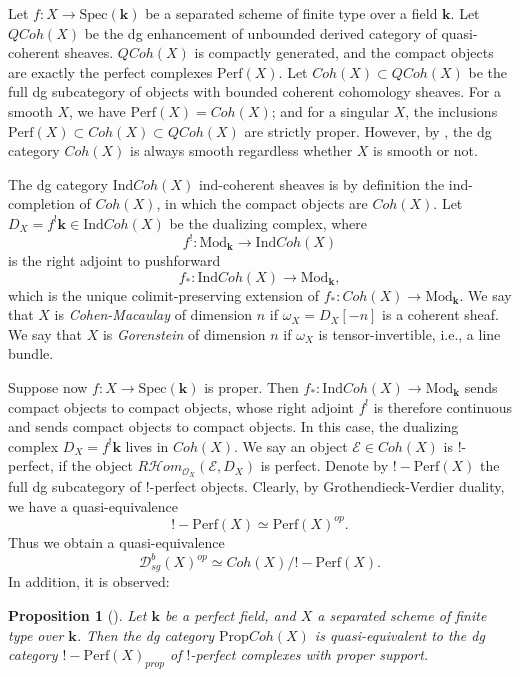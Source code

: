 \documentclass[11pt]{amsproc}
\def\K{{\mathbf{k}}}
\def\o{\mathcal{O}}
\def\dd{\mathcal{D}}
\def\ee{\mathcal{E}}
\def\r#1{\mathrm{#1}}
\def\perf{\mathrm{Perf}}
\newtheorem{prop}[lem]{Proposition}
\theoremstyle{remark}
\numberwithin{equation}{section}
\begin{document}
Let $f: X \to \r{Spec}(\K)$ be a separated scheme of finite type over a field $\K$.
Let $QCoh(X)$ be the dg enhancement of unbounded derived category of quasi-coherent sheaves.
$QCoh(X)$ is compactly generated, 
and the compact objects are exactly the perfect complexes $\perf(X)$.
Let $Coh(X) \subset QCoh(X)$ be the full dg subcategory of objects with bounded coherent cohomology sheaves.
For a smooth $X$, we have $\perf(X) = Coh(X)$;
and for a singular $X$, the inclusions $\perf(X) \subset Coh(X) \subset QCoh(X)$ are strictly proper.
However, by \cite[Theorem 6.3]{lunts}, the dg category $Coh(X)$ is always smooth regardless whether $X$ is smooth or not.

The dg category $\r{Ind}Coh(X)$ ind-coherent sheaves is by definition the ind-completion of $Coh(X)$,
in which the compact objects are $Coh(X)$.
Let $D_{X} = f^{!}\K \in \r{Ind} Coh(X)$ be the dualizing complex,
where 
\[
f^{!}: \r{Mod}_{\K} \to \r{Ind} Coh(X)
\]
is the right adjoint to pushforward 
\[
f_{*}: \r{Ind} Coh(X) \to \r{Mod}_{\K},
\]
which is the unique colimit-preserving extension of $f_{*}: Coh(X) \to \r{Mod}_{\K}$.
We say that $X$ is {\it Cohen-Macaulay} of dimension $n$ if $\omega_{X} = D_{X}[-n]$ is a coherent sheaf.
We say that $X$ is {\it Gorenstein} of dimension $n$ if $\omega_{X}$ is tensor-invertible, i.e., a line bundle.

Suppose now $f: X \to \r{Spec}(\K)$ is proper.
Then $f_{*}: \r{Ind}Coh(X) \to \r{Mod}_{\K}$ sends compact objects to compact objects,
whose right adjoint $f^{!}$ is therefore continuous and sends compact objects to compact objects.
In this case, the dualizing complex $D_{X} = f^{!}\K$ lives in $Coh(X)$.
We say an object $\ee \in Coh(X)$ is $!$-perfect,
if the object $R\mathcal{H}om_{\o_{X}}(\ee, D_{X})$ is perfect.
Denote by $!\!-\! \perf(X)$ the full dg subcategory of $!$-perfect objects.
Clearly, by Grothendieck-Verdier duality,
we have a quasi-equivalence
\[
!\!-\! \perf(X) \simeq \perf(X)^{op}.
\]
Thus we obtain a quasi-equivalence
\begin{equation}
\dd^{b}_{sg}(X)^{op} \simeq Coh(X)/!\!-\! \perf(X).
\end{equation}
In addition, it is observed:

\begin{prop}[{\cite[Proposition B.1]{efimov2}}]
Let $\K$ be a perfect field,
and $X$ a separated scheme of finite type over $\K$.
Then the dg category $\r{Prop} Coh(X)$ is quasi-equivalent to the dg category $!\!-\! \perf(X)_{prop}$ of $!$-perfect complexes with proper support.
\end{prop}
\end{document}
